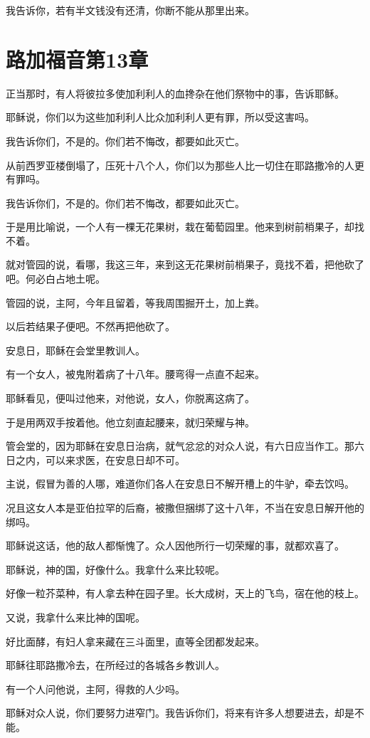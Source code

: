 \documentclass[12pt,oneside]{book}
\begin{document}
我告诉你，若有半文钱没有还清，你断不能从那里出来。

\chapter{路加福音第13章}
正当那时，有人将彼拉多使加利利人的血搀杂在他们祭物中的事，告诉耶稣。

耶稣说，你们以为这些加利利人比众加利利人更有罪，所以受这害吗。

我告诉你们，不是的。你们若不悔改，都要如此灭亡。

从前西罗亚楼倒塌了，压死十八个人，你们以为那些人比一切住在耶路撒冷的人更有罪吗。

我告诉你们，不是的。你们若不悔改，都要如此灭亡。

于是用比喻说，一个人有一棵无花果树，栽在葡萄园里。他来到树前梢果子，却找不着。

就对管园的说，看哪，我这三年，来到这无花果树前梢果子，竟找不着，把他砍了吧。何必白占地土呢。

管园的说，主阿，今年且留着，等我周围掘开土，加上粪。

以后若结果子便吧。不然再把他砍了。

安息日，耶稣在会堂里教训人。

有一个女人，被鬼附着病了十八年。腰弯得一点直不起来。

耶稣看见，便叫过他来，对他说，女人，你脱离这病了。

于是用两双手按着他。他立刻直起腰来，就归荣耀与神。

管会堂的，因为耶稣在安息日治病，就气忿忿的对众人说，有六日应当作工。那六日之内，可以来求医，在安息日却不可。

主说，假冒为善的人哪，难道你们各人在安息日不解开槽上的牛驴，牵去饮吗。

况且这女人本是亚伯拉罕的后裔，被撒但捆绑了这十八年，不当在安息日解开他的绑吗。

耶稣说这话，他的敌人都惭愧了。众人因他所行一切荣耀的事，就都欢喜了。

耶稣说，神的国，好像什么。我拿什么来比较呢。

好像一粒芥菜种，有人拿去种在园子里。长大成树，天上的飞鸟，宿在他的枝上。

又说，我拿什么来比神的国呢。

好比面酵，有妇人拿来藏在三斗面里，直等全团都发起来。

耶稣往耶路撒冷去，在所经过的各城各乡教训人。

有一个人问他说，主阿，得救的人少吗。

耶稣对众人说，你们要努力进窄门。我告诉你们，将来有许多人想要进去，却是不能。
\end{document}
